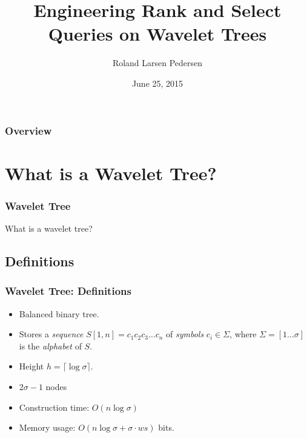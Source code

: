 \documentclass{beamer}
\title[Wavelet Tree]{Engineering Rank and Select Queries on Wavelet Trees} %
\author{Roland Larsen Pedersen} %
\institute[Datalogi] %
{
Datalogi, Aarhus Universitet \\ %
\medskip
\textit{Thesis defence}
}
\date{June 25, 2015} %
\begin{document}
\begin{frame}
\titlepage %
\end{frame}

\begin{frame}
\frametitle{Overview} %
\tableofcontents %
\end{frame}



\section{What is a Wavelet Tree?}

\begin{frame}
\frametitle{Wavelet Tree}
\begin{center} \Huge{What is a wavelet tree?} \end{center}
\end{frame}

\subsection{Definitions}
\begin{frame}
\frametitle{Wavelet Tree: Definitions}
\begin{itemize}
\item Balanced binary tree. 
\item Stores a \textit{sequence} $S[1,n] = c_1c_2c_3 \ldots c_n$ of \textit{symbols} $c_i \in \Sigma$, where $\Sigma = [1 \ldots \sigma]$ is the \textit{alphabet} of $S$.
\item Height $h = \lceil \log \sigma \rceil$.
\item $2 \sigma - 1$ nodes
\item Construction time: $O(n \log \sigma)$
\item Memory usage: $O(n \log \sigma + \sigma \cdot \mathit{ws})$ bits.
\end{itemize}

\end{frame}
\end{document}
